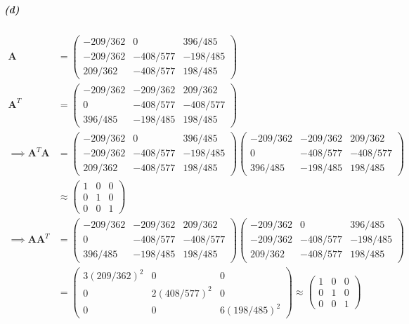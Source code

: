 \documentclass[12pt, letterpaper]{article}
\begin{document}
\subparagraph{(d)}

\[
\begin{split}
\mathbf{A} &= \begin{pmatrix}
  -209/362 &0 &396/485\\
  -209/362 &-408/577 &-198/485\\
  209/362 &-408/577 &198/485
\end{pmatrix}\\
\mathbf{A}^T &= \begin{pmatrix}
  -209/362 &-209/362 &209/362\\
  0 &-408/577 &-408/577\\
  396/485 &-198/485 &198/485
\end{pmatrix}\\
\implies \mathbf{A}^T\mathbf{A} &=
\begin{pmatrix}
  -209/362 &0 &396/485\\
  -209/362 &-408/577 &-198/485\\
  209/362 &-408/577 &198/485
\end{pmatrix}
\begin{pmatrix}
  -209/362 &-209/362 &209/362\\
  0 &-408/577 &-408/577\\
  396/485 &-198/485 &198/485
\end{pmatrix}\\
&\approx \begin{pmatrix}
1 &0 &0\\
0 &1 &0\\
0 &0 &1
\end{pmatrix}\\
\implies \mathbf{A}\mathbf{A}^T &=
\begin{pmatrix}
  -209/362 &-209/362 &209/362\\
  0 &-408/577 &-408/577\\
  396/485 &-198/485 &198/485
\end{pmatrix}
\begin{pmatrix}
  -209/362 &0 &396/485\\
  -209/362 &-408/577 &-198/485\\
  209/362 &-408/577 &198/485
\end{pmatrix}\\
&= \begin{pmatrix}
3(209/362)^2 &0 &0\\
0 &2(408/577)^2 &0\\
0 &0 &6(198/485)^2
\end{pmatrix}
\approx \begin{pmatrix} 1 &0 &0\\ 0 &1 &0\\ 0 &0 &1 \end{pmatrix}\\
\end{split}
\]
\end{document}
